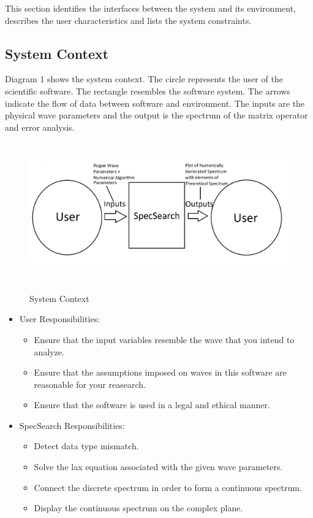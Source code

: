 \documentclass[12pt]{article}
\begin{document}
This section identifies the interfaces between the system and its environment,
describes the user characteristics and lists the system constraints.

\subsection{System Context} 
Diagram 1 shows the system context. The circle represents the user of the 
scientific software. The rectangle resembles the software system. The arrows 
indicate the flow of data between software and environment. The inputs are the 
physical wave parameters and the output is the spectrum of the matrix operator 
and error analysis.
 \begin{figure}[h!]
	\begin{center}
		{
			\includegraphics[width=15cm,height=6cm]{SystemContext.png}
		} 
	\caption{System Context}
	\end{center}
 \end{figure}

\begin{itemize}
\item User Responsibilities:
\begin{itemize}
\item Ensure that the input variables resemble the wave that you intend 
to analyze.
\item Ensure that the assumptions imposed on waves in this software are 
reasonable 
for your reasearch.
\item Ensure that the software is used in a legal and ethical manner.

\end{itemize}
\item SpecSearch Responsibilities:

\begin{itemize}
\item Detect data type mismatch. 
\item Solve the lax equation associated with the given wave parameters. 
\item Connect the discrete spectrum in order to form a continuous spectrum. 
\item Display the continuous spectrum on the complex plane.
\end{itemize}
\end{itemize}
\end{document}
